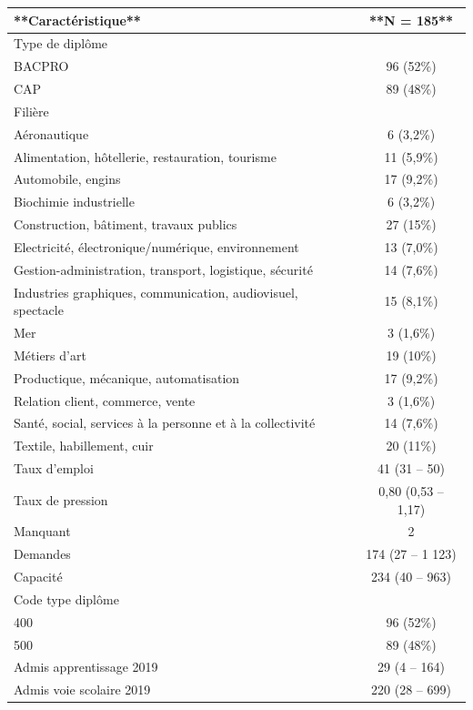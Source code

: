 \documentclass[
]{book}
\begin{document}
\begin{tabular}{l|c}
\hline
**Caractéristique** & **N = 185**\\
\hline
Type de diplôme & \\
\hline
BACPRO & 96 (52\%)\\
\hline
CAP & 89 (48\%)\\
\hline
Filière & \\
\hline
Aéronautique & 6 (3,2\%)\\
\hline
Alimentation, hôtellerie, restauration, tourisme & 11 (5,9\%)\\
\hline
Automobile, engins & 17 (9,2\%)\\
\hline
Biochimie industrielle & 6 (3,2\%)\\
\hline
Construction, bâtiment, travaux publics & 27 (15\%)\\
\hline
Electricité, électronique/numérique, environnement & 13 (7,0\%)\\
\hline
Gestion-administration, transport, logistique, sécurité & 14 (7,6\%)\\
\hline
Industries graphiques, communication, audiovisuel, spectacle & 15 (8,1\%)\\
\hline
Mer & 3 (1,6\%)\\
\hline
Métiers d'art & 19 (10\%)\\
\hline
Productique, mécanique, automatisation & 17 (9,2\%)\\
\hline
Relation client, commerce, vente & 3 (1,6\%)\\
\hline
Santé, social, services à la personne et à la collectivité & 14 (7,6\%)\\
\hline
Textile, habillement, cuir & 20 (11\%)\\
\hline
Taux d'emploi & 41 (31 – 50)\\
\hline
Taux de pression & 0,80 (0,53 – 1,17)\\
\hline
Manquant & 2\\
\hline
Demandes & 174 (27 – 1 123)\\
\hline
Capacité & 234 (40 – 963)\\
\hline
Code type diplôme & \\
\hline
400 & 96 (52\%)\\
\hline
500 & 89 (48\%)\\
\hline
Admis apprentissage 2019 & 29 (4 – 164)\\
\hline
Admis voie scolaire 2019 & 220 (28 – 699)\\
\hline
\end{tabular}
\end{document}
